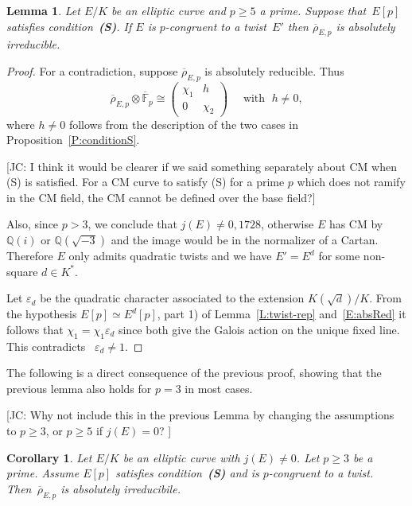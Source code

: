 \documentclass[12pt, reqno]{amsart}
\newcommand{\F}{\mathbb{F}}
\newcommand{\Fbar}{{\overline{\F}}}
\newcommand{\Q}{\mathbb{Q}}
\newcommand{\rhobar}{{\overline{\rho}}}
\newcommand{\eps}{\varepsilon}
\numberwithin{equation}{section}
\newtheorem{lemma}[theorem]{Lemma}
\newtheorem{corollary}[theorem]{Corollary}
\theoremstyle{definition}
\theoremstyle{remark}
\newcommand{\jc}[1]{{\color{darkgreen} \textsf{[JC: #1]}}}
\begin{document}
\begin{lemma} \label{L:noCyclic}
Let $E/K$ be an elliptic curve and $p \geq 5$ a prime. Suppose that~$E[p]$ satisfies condition~{\bf (S)}. 
If $E$ is $p$-congruent to a twist~$E'$ then $\rhobar_{E,p}$ is absolutely irreducible.
\end{lemma}
\begin{proof}
For a contradiction, suppose $\rhobar_{E,p}$ is absolutely reducible. Thus
\begin{equation} \label{E:absRed}
  \rhobar_{E,p} \otimes \Fbar_p \cong 
 \begin{pmatrix}
 \chi_1 & h \\ 0 &\chi_2
 \end{pmatrix} \quad \text{ with } \; h \neq 0, 
\end{equation} 
where $h \neq 0$ follows from 
the description of the two cases
in Proposition~\ref{P:conditionS}.

\jc{I think it would be clearer if we said something separately about
  CM when (S) is satisfied.  For a CM curve to satisfy (S) for a prime
$p$ which does not ramify in the CM field, the CM cannot be defined
  over the base field?}

Also, since $p > 3$, we conclude that $j(E) \neq 0, 1728$, 
otherwise $E$ has CM by~$\Q(i)$ or $\Q(\sqrt{-3})$ and the image would be in the normalizer of a Cartan. Therefore $E$ only admits quadratic twists and we have $E' = E^d$ for some non-square $d \in K^*$.

Let $\eps_d$ be the quadratic character associated to the extension
$K(\sqrt{d})/K$. From 
the hypothesis  
$E[p] \simeq E^d[p]$, 
part 1) of Lemma~\ref{L:twist-rep}
and~\eqref{E:absRed} it follows that
$\chi_1 =\chi_1\eps_d$
since both give the Galois action on the unique fixed line. This contradicts ~$\eps_d \neq 1$.
\end{proof}

The following is a direct consequence of the previous proof, showing that the previous lemma also holds for $p=3$ in most cases.

\jc{Why not include this in the previous Lemma by changing the
  assumptions to $p\ge3$, or $p\ge5$ if $j(E)=0$?  }

\begin{corollary}\label{C:noCyclic}
 Let $E/K$ be an elliptic curve with $j(E) \neq 0$. Let $p \geq 3$ be a prime.
Assume $E[p]$ satisfies condition~{\bf (S)} and is $p$-congruent to a twist. Then~$\rhobar_{E,p}$ is absolutely irreducibile.
\end{corollary}
\end{document}
